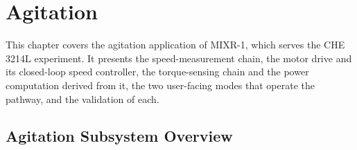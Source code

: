 
\chapter{Agitation}
\label{ch:agitation}

\ifpdf
    \graphicspath{{Chapter5/Figs/Raster/}{Chapter5/Figs/PDF/}{Chapter5/Figs/}}
\else
    \graphicspath{{Chapter5/Figs/Vector/}{Chapter5/Figs/}}
\fi

This chapter covers the agitation application of MIXR-1, which serves the CHE 3214L experiment. It presents the speed-measurement chain, the motor drive and its closed-loop speed controller, the torque-sensing chain and the power computation derived from it, the two user-facing modes that operate the pathway, and the validation of each.


\section{Agitation Subsystem Overview}
\label{sec:agit-overview}

